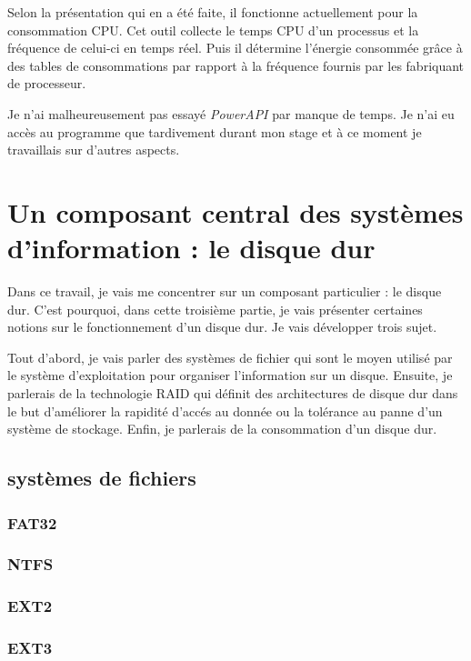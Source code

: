 \documentclass[a4paper, 11pt]{report}
\begin{document}
Selon la présentation qui en a été faite, il fonctionne actuellement pour la consommation CPU. Cet outil collecte le temps CPU d'un processus et la fréquence de celui-ci en temps réel. Puis il détermine l'énergie consommée grâce à des tables de consommations par rapport à la fréquence fournis par les fabriquant de processeur.

Je n'ai malheureusement pas essayé \textit{PowerAPI} par manque de temps. Je n'ai eu accès au programme que tardivement durant mon stage et à ce moment je travaillais sur d'autres aspects.
	
	\section{Un composant central des systèmes d'information : le disque dur}
Dans ce travail, je vais me concentrer sur un composant particulier : le disque dur. C'est pourquoi, dans cette troisième partie, je vais présenter certaines notions sur le fonctionnement d'un disque dur. Je vais développer trois sujet. 

Tout d'abord, je vais parler des systèmes de fichier qui sont le moyen utilisé par le système d'exploitation pour organiser l'information sur un disque. Ensuite, je parlerais de la technologie RAID qui définit des architectures de disque dur dans le but d'améliorer la rapidité d'accés au donnée ou la tolérance au panne d'un système de stockage. Enfin, je parlerais de la consommation d'un disque dur.
		
		\subsection{systèmes de fichiers}
			\subsubsection{FAT32}
			
			\subsubsection{NTFS}
			
			\subsubsection{EXT2}
			
			\subsubsection{EXT3}
			
\end{document}
